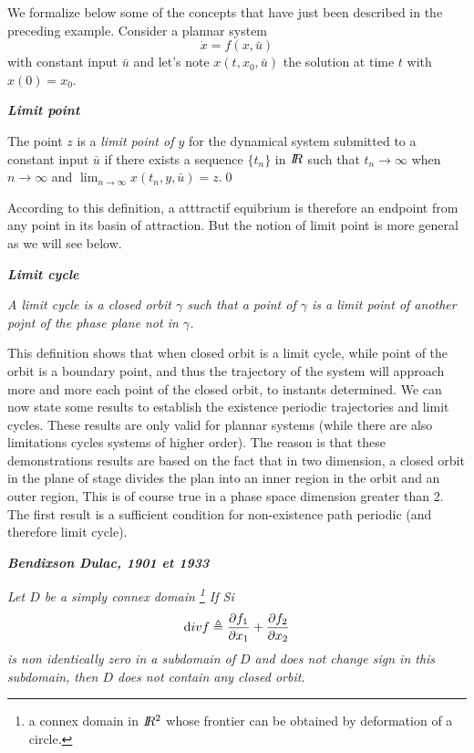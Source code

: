 We formalize below some of the concepts that have just been
described in the preceding example. Consider a plannar system $$\dot x=f(x,\bar u)$$ 
with constant input $\bar u$ and let's note $x(t,x_0,\bar u)$ the solution at time $t$ with $x(0)=x_0$.

\begin{definition}{\bf\em Limit point}

The point $z$ is a {\em limit point of $y$} for the dynamical system submitted to a constant input $\bar u$
if there exists a sequence $\{t_n\}$ in
$I \! \! R$ such that $t_n \rightarrow \infty$ when $n \rightarrow \infty$ and
$\lim_{n\rightarrow \infty} x(t_n,y,\bar u)=z$.\qed
\end{definition}

According to this definition, a atttractif equibrium is therefore an endpoint
from any point in its basin of attraction. But the notion of limit point is more
general as we will see below.

\begin{definition}{\bf \em Limit cycle}

{\em A {\em limit cycle} is a closed orbit $\gamma$ such that a point of $\gamma$ is a limit point of another pojnt of the phase plane not in 
$\gamma$.}\cqfd\end{definition}

This definition shows that when closed orbit is a limit cycle, while
point of the orbit is a boundary point, and thus the trajectory of the system
will approach more and more each point of the closed orbit, to
instants determined.
We can now state some results to establish the existence
periodic trajectories and limit cycles. These results are only valid
for plannar systems (while there are also limitations cycles
systems of higher order). The reason is that these demonstrations
results are based on the fact that in two dimension, a closed orbit in the plane of
stage divides the plan into an inner region in the orbit and an outer region,
This is of course true in a phase space dimension greater than
2. The first result is a sufficient condition for non-existence path
periodic (and therefore limit cycle).

\begin{theoreme} {\bf \em Bendixson Dulac, 1901 et 1933} 

{\em Let $D$ be a simply connex domain \footnote{a connex domain in  $I \! \! R^2$ whose frontier can be obtained by deformation of a circle.}
If Si $${\mbox div}f \triangleq \frac{\partial f_1}{\partial
x_1}+\frac{\partial f_2}{\partial x_2}$$ is non identically zero in a subdomain of $D$ and does not change sign in this subdomain,
then $D$ does not contain any closed orbit.}\cqfd\end{theoreme}

